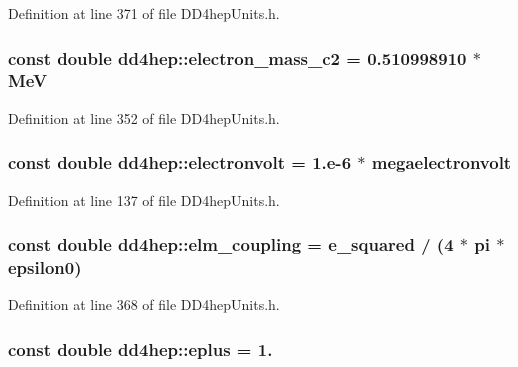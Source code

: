 Definition at line 371 of file DD4hepUnits.h.\hypertarget{namespacedd4hep_a90fb8853ce4da9b13bd108593b2d154d}{
\subsubsection[{electron\_\-mass\_\-c2}]{\setlength{\rightskip}{0pt plus 5cm}const double {\bf dd4hep::electron\_\-mass\_\-c2} = 0.510998910 $\ast$ {\bf MeV}}}
\label{namespacedd4hep_a90fb8853ce4da9b13bd108593b2d154d}


Definition at line 352 of file DD4hepUnits.h.\hypertarget{namespacedd4hep_a849fe8dd27af5a22a8d7891687a4d499}{
\subsubsection[{electronvolt}]{\setlength{\rightskip}{0pt plus 5cm}const double {\bf dd4hep::electronvolt} = 1.e-\/6 $\ast$ {\bf megaelectronvolt}}}
\label{namespacedd4hep_a849fe8dd27af5a22a8d7891687a4d499}


Definition at line 137 of file DD4hepUnits.h.\hypertarget{namespacedd4hep_ace30ae02d909a752d5e3f2138bf4ecb1}{
\subsubsection[{elm\_\-coupling}]{\setlength{\rightskip}{0pt plus 5cm}const double {\bf dd4hep::elm\_\-coupling} = {\bf e\_\-squared} / (4 $\ast$ {\bf pi} $\ast$ {\bf epsilon0})}}
\label{namespacedd4hep_ace30ae02d909a752d5e3f2138bf4ecb1}


Definition at line 368 of file DD4hepUnits.h.\hypertarget{namespacedd4hep_a96ccff254b6dcebf179c3630f6205857}{
\subsubsection[{eplus}]{\setlength{\rightskip}{0pt plus 5cm}const double {\bf dd4hep::eplus} = 1.}}
\label{namespacedd4hep_a96ccff254b6dcebf179c3630f6205857}


